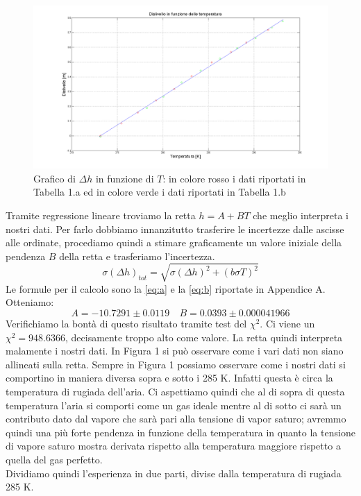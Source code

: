 \begin{figure}[H]
\centering
\includegraphics[width=\textwidth]{img/1}
\caption{Grafico di $\Delta h$ in funzione di $T$: in colore rosso i dati riportati in Tabella 1.a ed in colore verde i dati riportati in Tabella 1.b }
\end{figure}

Tramite regressione lineare troviamo la retta $h = A+BT$ che meglio interpreta i nostri dati. 
Per farlo dobbiamo innanzitutto trasferire le incertezze dalle ascisse alle ordinate, procediamo quindi a stimare graficamente un valore iniziale della pendenza $B$ della retta e trasferiamo l'incertezza.
\begin{equation}
\label{eq:propagazione}
\sigma(\Delta h)_{tot} = \sqrt{\sigma(\Delta h)^2 + (b\sigma T)^2}
\end{equation}
Le formule per il calcolo sono la \eqref{eq:a} e la \eqref{eq:b} riportate in Appendice A. 
Otteniamo:
\[A = -10.7291 \pm 0.0119 \quad  B = 0.0393\pm  0.000041966\]
Verifichiamo la bontà di questo risultato tramite test del $\chi^2$. 
Ci viene un $\chi^2 = 948.6366$, decisamente troppo alto come valore.
La retta quindi interpreta malamente i nostri dati. 
In Figura 1 si può osservare come i vari dati non siano allineati sulla retta. 
Sempre in Figura 1 possiamo osservare come i nostri dati si comportino in maniera diversa sopra e sotto i 285 K. 
Infatti questa è circa la temperatura di rugiada dell'aria. 
Ci aspettiamo quindi che al di sopra di questa temperatura l'aria si comporti come un gas ideale mentre al di sotto ci sarà un contributo dato dal vapore che sarà pari alla tensione di vapor saturo; avremmo quindi una più forte pendenza in funzione della temperatura in quanto la tensione di vapore saturo mostra derivata rispetto alla temperatura maggiore rispetto a quella del gas perfetto.\\
\newline
Dividiamo quindi l'esperienza in due parti, divise dalla temperatura di rugiada 285 K.

